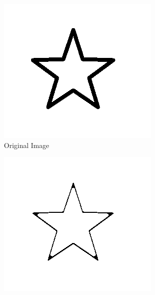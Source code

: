\begin{figure}[ht]
    \centering
    \begin{subfigure}{0.33\textwidth}
        \centering
        \includegraphics[width=.99\linewidth]{images/literature/morphological/star}
        \caption{Original Image}
    \end{subfigure}%
    \begin{subfigure}{.33\textwidth}
        \centering
        \includegraphics[width=.99\linewidth]{images/literature/morphological/dilation}

\end{subfigure}
\end{figure}
